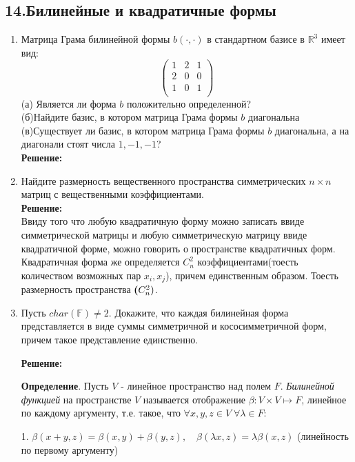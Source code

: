 \documentclass[]{book}
\theoremstyle{definition}
\newcommand{\bb}[1]{\mathbb{#1}}
\begin{document}
\subsection*{14.Билинейные и квадратичные формы}

\begin{enumerate}[resume]

\item  Матрица Грама билинейной формы $b(\cdot,\cdot)$ в стандартном базисе в $\bb{R}^3$ имеет вид:
$$
\begin{pmatrix}
1 & 2 & 1\\
2 & 0 & 0\\
1 & 0 & 1\\
\end{pmatrix}
$$
(а) Является ли форма $b$ положительно определенной?\\
(б)Найдите базис, в котором матрица Грама формы $b$ диагональна\\
(в)Существует ли базис, в котором матрица Грама формы $b$ диагональна, а на диагонали стоят числа $1, -1, -1$?\\
\textbf{Решение:}\\

\item Найдите размерность вещественного пространства симметрических $n\times n$ матриц с вещественными коэффициентами.\\
\textbf{Решение:}\\
Ввиду того что любую квадратичную форму можно записать ввиде симметрической матрицы и любую симметрическую матрицу ввиде квадратичной форме, можно говорить о пространстве квадратичных форм.\\
Квадратичная форма же определяется $C_n^2$ коэффициентами(тоесть количеством возможных пар $x_i,x_j$), причем единственным образом. Тоесть размерность пространства $\textbf(C_n^2)$.


\item Пусть $char(\bb{F})\neq 2$. Докажите, что каждая билинейная форма представляется в виде суммы симметричной и кососимметричной форм, причем такое представление единственно.

\textbf{Решение:}

\textbf{Определение}. Пусть $V$ - линейное пространство над полем $F$. \textit{Билинейной функцией} на пространстве $V$ называется отображение $\beta \colon V \times V \mapsto F$, линейное по каждому аргументу, т.е. такое, что $\forall x, y, z \in V \; \forall \lambda \in F$:

1. $\beta(x + y, z) = \beta(x, y) + \beta(y, z), \quad \beta(\lambda x, z) = \lambda \beta(x,z)$ (линейность по первому аргументу)


\end{enumerate}
\end{document}
